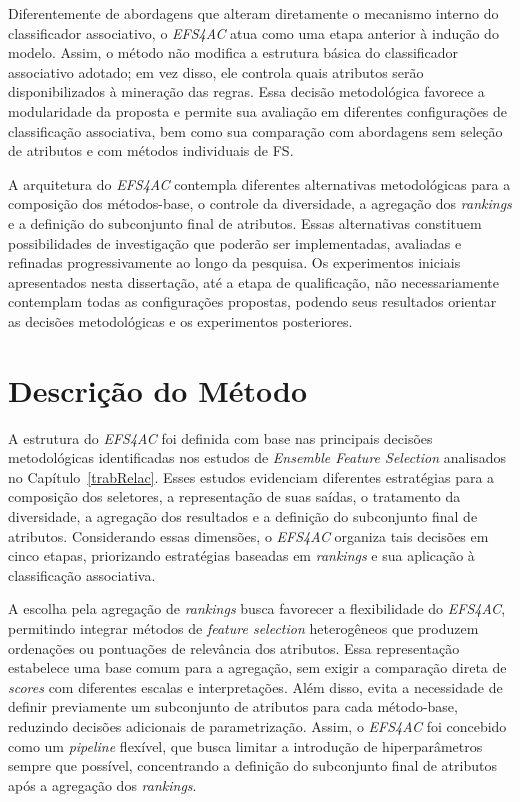 Diferentemente de abordagens que alteram diretamente o mecanismo interno do
classificador associativo, o \textit{EFS4AC} atua como uma etapa anterior à
indução do modelo. Assim, o método não modifica a estrutura básica do
classificador associativo adotado; em vez disso, ele controla quais atributos
serão disponibilizados à mineração das regras. Essa decisão metodológica
favorece a modularidade da proposta e permite sua avaliação em diferentes
configurações de classificação associativa, bem como sua comparação com
abordagens sem seleção de atributos e com métodos individuais de FS.

A arquitetura do \textit{EFS4AC} contempla diferentes alternativas metodológicas para a composição dos métodos-base, o controle da diversidade, a agregação dos \textit{rankings} e a definição do subconjunto final de atributos. Essas alternativas constituem possibilidades de investigação que poderão ser implementadas, avaliadas e refinadas progressivamente ao longo da pesquisa. Os experimentos iniciais apresentados nesta dissertação, até a etapa de qualificação, não necessariamente contemplam todas as configurações propostas, podendo seus resultados orientar as decisões metodológicas e os experimentos posteriores.

\section{Descrição do Método}\label{sec:ac-efs-visao-geral}

A estrutura do \textit{EFS4AC} foi definida com base nas principais decisões metodológicas identificadas nos estudos de \textit{Ensemble Feature Selection} analisados no Capítulo~\ref{trabRelac}. Esses estudos evidenciam diferentes estratégias para a composição dos seletores, a representação de suas saídas, o tratamento da diversidade, a agregação dos resultados e a definição do subconjunto final de atributos. Considerando essas dimensões, o \textit{EFS4AC} organiza tais decisões em cinco etapas, priorizando estratégias baseadas em \textit{rankings} e sua aplicação à classificação associativa.

A escolha pela agregação de \textit{rankings} busca favorecer a flexibilidade do \textit{EFS4AC}, permitindo integrar métodos de \textit{feature selection} heterogêneos que produzem ordenações ou pontuações de relevância dos atributos. Essa representação estabelece uma base comum para a agregação, sem exigir a comparação direta de \textit{scores} com diferentes escalas e interpretações. Além disso, evita a necessidade de definir previamente um subconjunto de atributos para cada método-base, reduzindo decisões adicionais de parametrização. Assim, o \textit{EFS4AC} foi concebido como um \textit{pipeline} flexível, que busca limitar a introdução de hiperparâmetros sempre que possível, concentrando a definição do subconjunto final de atributos após a agregação dos \textit{rankings}.

